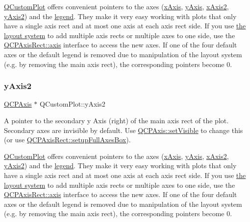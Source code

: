 \hyperlink{class_q_custom_plot}{Q\+Custom\+Plot} offers convenient pointers to the axes (\hyperlink{class_q_custom_plot_a9a79cd0158a4c7f30cbc702f0fd800e4}{x\+Axis}, \hyperlink{class_q_custom_plot_af6fea5679725b152c14facd920b19367}{y\+Axis}, \hyperlink{class_q_custom_plot_ada41599f22cad901c030f3dcbdd82fd9}{x\+Axis2}, \hyperlink{class_q_custom_plot_af13fdc5bce7d0fabd640f13ba805c0b7}{y\+Axis2}) and the \hyperlink{class_q_custom_plot_a4eadcd237dc6a09938b68b16877fa6af}{legend}. They make it very easy working with plots that only have a single axis rect and at most one axis at each axis rect side. If you use \hyperlink{}{the layout system} to add multiple axis rects or multiple axes to one side, use the \hyperlink{class_q_c_p_axis_rect_a583ae4f6d78b601b732183f6cabecbe1}{Q\+C\+P\+Axis\+Rect\+::axis} interface to access the new axes. If one of the four default axes or the default legend is removed due to manipulation of the layout system (e.\+g. by removing the main axis rect), the corresponding pointers become 0. \hypertarget{class_q_custom_plot_af13fdc5bce7d0fabd640f13ba805c0b7}{}\label{class_q_custom_plot_af13fdc5bce7d0fabd640f13ba805c0b7} 
\subsubsection{\texorpdfstring{y\+Axis2}{yAxis2}}
{\footnotesize\ttfamily \hyperlink{class_q_c_p_axis}{Q\+C\+P\+Axis} $\ast$ Q\+Custom\+Plot\+::y\+Axis2}

A pointer to the secondary y Axis (right) of the main axis rect of the plot. Secondary axes are invisible by default. Use \hyperlink{class_q_c_p_layerable_a3bed99ddc396b48ce3ebfdc0418744f8}{Q\+C\+P\+Axis\+::set\+Visible} to change this (or use \hyperlink{class_q_c_p_axis_rect_a5fa906175447b14206954f77fc7f1ef4}{Q\+C\+P\+Axis\+Rect\+::setup\+Full\+Axes\+Box}).

\hyperlink{class_q_custom_plot}{Q\+Custom\+Plot} offers convenient pointers to the axes (\hyperlink{class_q_custom_plot_a9a79cd0158a4c7f30cbc702f0fd800e4}{x\+Axis}, \hyperlink{class_q_custom_plot_af6fea5679725b152c14facd920b19367}{y\+Axis}, \hyperlink{class_q_custom_plot_ada41599f22cad901c030f3dcbdd82fd9}{x\+Axis2}, \hyperlink{class_q_custom_plot_af13fdc5bce7d0fabd640f13ba805c0b7}{y\+Axis2}) and the \hyperlink{class_q_custom_plot_a4eadcd237dc6a09938b68b16877fa6af}{legend}. They make it very easy working with plots that only have a single axis rect and at most one axis at each axis rect side. If you use \hyperlink{}{the layout system} to add multiple axis rects or multiple axes to one side, use the \hyperlink{class_q_c_p_axis_rect_a583ae4f6d78b601b732183f6cabecbe1}{Q\+C\+P\+Axis\+Rect\+::axis} interface to access the new axes. If one of the four default axes or the default legend is removed due to manipulation of the layout system (e.\+g. by removing the main axis rect), the corresponding pointers become 0. 

